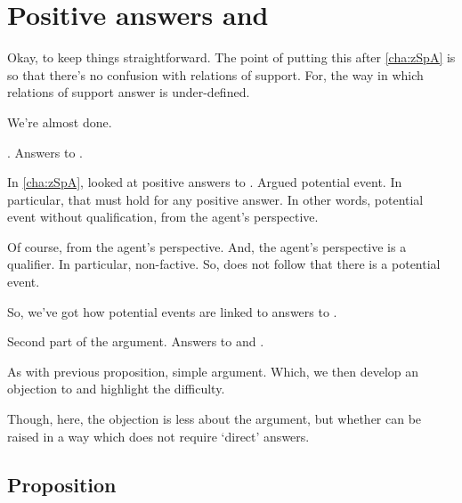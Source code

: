 \chapter{Positive answers and \qWhy{}}
\label{cha:zSpAwhy}

\begin{note}
  \color{red}
  Okay, to keep things straightforward.
  The point of putting this after \autoref{cha:zSpA} is so that there's no confusion with relations of support.
  For, the way in which relations of support answer \qWhy{} is under-defined.
\end{note}

\begin{note}
  We're almost done.

  \qzS{}.
  Answers to \qzS{}.

  In \autoref{cha:zSpA}, looked at positive answers to \qzS{}.
  Argued potential event.
  In particular, that \ptivity{} must hold for any positive answer.
  In other words, potential event without qualification, from the agent's perspective.

  Of course, from the agent's perspective.
  And, the agent's perspective is a qualifier.
  In particular, non-factive.
  So, does not follow that there is a potential event.
\end{note}

\begin{note}
  So, we've got how potential events are linked to answers to \qzS{}.

  Second part of the argument.
  Answers to \qzS{} and \qWhy{}.

  As with previous proposition, simple argument.
  Which, we then develop an objection to and highlight the difficulty.

  Though, here, the objection is less about the argument, but whether \qzS{} can be raised in a way which does not require `direct' answers.
\end{note}

\section{Proposition}
\label{cha:zSpAwhy:sec:proposition}

